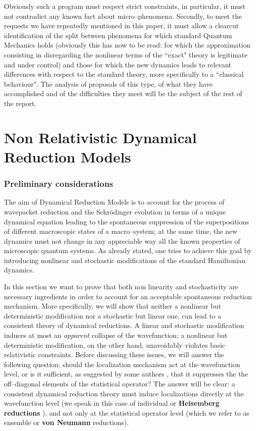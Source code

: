 \documentclass[10pt,a4paper]{article}
\begin{document}
Obviously such a program must respect strict constraints, in
particular, it must not contradict any known fact about
micro--phenomena. Secondly, to meet the requests we have
repeatedly mentioned in this paper, it must allow a clearcut
identification of the split between phenomena for which standard
Quantum Mechanics holds (obviously this has now to be read: for
which the approximation consisting in disregarding the nonlinear
terms of the ``exact" theory is legitimate and under control) and
those for which the new dynamics leads to relevant differences
with respect to the standard theory, more specifically to a
``classical behaviour". The analysis of proposals of this type, of
what they have accomplished and of the difficulties they meet will
be the subject of the rest of the report.



\part{Non Relativistic Dynamical Reduction Models}

\section{Preliminary considerations} \label{sec4}


The aim of Dynamical Reduction Models is to account for the
process of wavepacket reduction and the Schr\"odinger evolution in
terms of a unique dynamical equation leading to the spontaneous
suppression of the superpositions of different macroscopic states
of a macro--system; at the same time, the new dynamics must not
change in any appreciable way all the known properties of
microscopic quantum systems. As already stated, one tries to
achieve this goal by introducing nonlinear and stochastic
modifications of the standard Hamiltonian dynamics.

In this section we want to prove that both non linearity and
stochasticity are necessary ingredients in order to account for an
acceptable spontaneous reduction mechanism. More specifically, we
will show that neither a nonlinear but deterministic modification
nor a stochastic but linear one, can lead to a consistent theory
of dynamical reductions. A linear and stochastic modification
induces at most an {\it apparent} collapse of the wavefunction; a
nonlinear but deterministic modification, on the other hand,
unavoidably violates basic relativistic constraints. Before
discussing these issues, we will answer the following question:
should the localization mechanism act at the wavefunction level,
or is it sufficient, as suggested by some authors
\cite{zur1,zu,lib}, that it suppresses the the off--diagonal
elements of the statistical operator? The answer will be clear: a
consistent dynamical reduction theory must induce localizations
directly at the wavefunction level (we speak in this case of
individual or {\bf Heisemberg reductions} \cite{std}), and not
only at the statistical operator level (which we refer to as
ensemble or {\bf von Neumann} reductions).
\end{document}

